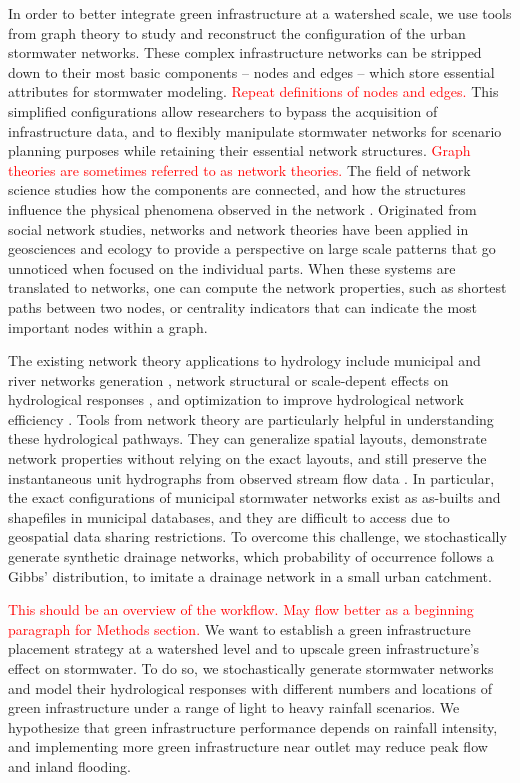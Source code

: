 \documentclass[draft]{agujournal2019}
\begin{document}
In order to better integrate green infrastructure at a watershed scale, we use tools from graph theory to study and reconstruct the configuration of the urban stormwater networks. These complex infrastructure networks can be stripped down to their most basic components -- nodes and edges -- which store essential attributes for stormwater modeling. \textcolor{red}{Repeat definitions of nodes and edges.} This simplified configurations allow researchers to bypass the acquisition of infrastructure data, and to flexibly manipulate stormwater networks for scenario planning purposes while retaining their essential network structures. \textcolor{red}{Graph theories are sometimes referred to as network theories.} The field of network science studies how the components are connected, and how the structures influence the physical phenomena observed in the network \cite{Newman2010}. Originated from social network studies, networks and network theories have been applied in geosciences \cite{Heckmann2015} and ecology \cite{Carraro2020} to provide a perspective on large scale patterns that go unnoticed when focused on the individual parts. When these systems are translated to networks, one can compute the network properties, such as shortest paths between two nodes, or centrality indicators that can indicate the most important nodes within a graph. 

The existing network theory applications to hydrology include municipal and river networks generation \cite{Barnes2020, Poulter2008, Troutman1985, Troutman 1989, Seo2012, Seo2013}, network structural or scale-depent effects on hydrological responses \cite{Riasi2017, Rodriguez-Iturbe1979}, and optimization to improve hydrological network efficiency \cite{}. Tools from network theory are particularly helpful in understanding these hydrological pathways. They can generalize spatial layouts, demonstrate network properties without relying on the exact layouts, and still preserve the instantaneous unit hydrographs from observed stream flow data \cite{Seo2012}. In particular, the exact configurations of municipal stormwater networks exist as as-builts and shapefiles in municipal databases, and they are difficult to access due to geospatial data sharing restrictions. To overcome this challenge, we stochastically generate synthetic drainage networks, which probability of occurrence follows a Gibbs' distribution, to imitate a drainage network in a small urban catchment. 

\textcolor{red}{This should be an overview of the workflow. May flow better as a beginning paragraph for Methods section.} We want to establish a green infrastructure placement strategy at a watershed level and to upscale green infrastructure's effect on stormwater. To do so, we stochastically generate stormwater networks and model their hydrological responses with different numbers and locations of green infrastructure under a range of light to heavy rainfall scenarios. We hypothesize that green infrastructure performance depends on rainfall intensity, and implementing more green infrastructure near outlet may reduce peak flow and inland flooding. 
\end{document}
